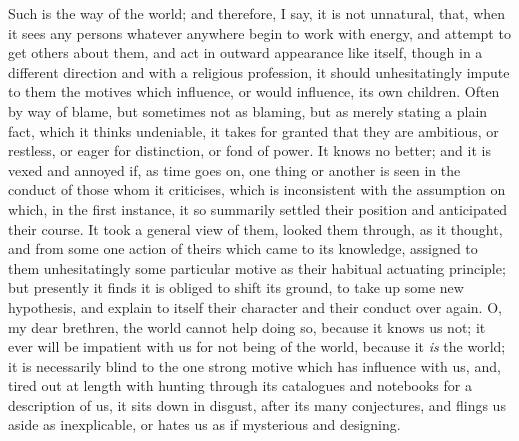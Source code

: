 Such is the way of the world; and therefore, I say, it is not
unnatural, that, when it sees any persons whatever anywhere begin to
work with energy, and attempt to get others about them, and act in
outward appearance like itself, though in a different direction and
with a religious profession, it should unhesitatingly impute to them
the motives which influence, or would influence, its own children.
Often by way of blame, but sometimes not as blaming, but as merely
stating a plain fact, which it thinks undeniable, it takes for granted
that they are ambitious, or restless, or eager for distinction, or
fond of power. It knows no better; and it is vexed and annoyed if, as
time goes on, one thing or another is seen in the conduct of those
whom it criticises, which is inconsistent with the assumption on
which, in the first instance, it so summarily settled their position
and anticipated their course. It took a general view of them, looked
them through, as it thought, and from some one action of theirs which
came to its knowledge, assigned to them unhesitatingly some particular
motive as their habitual actuating principle; but presently it finds
it is obliged to shift its ground, to take up some new hypothesis, and
explain to itself their character and their conduct over again. O, my
dear brethren, the world cannot help doing so, because it knows us
not; it ever will be impatient with us for not being of the world,
because it \emph{is} the world; it is necessarily blind to the one
strong motive which has influence with us, and, tired out at length
with hunting through its catalogues and notebooks for a description of
us, it sits down in disgust, after its many conjectures, and flings us
aside as inexplicable, or hates us as if mysterious and designing.

